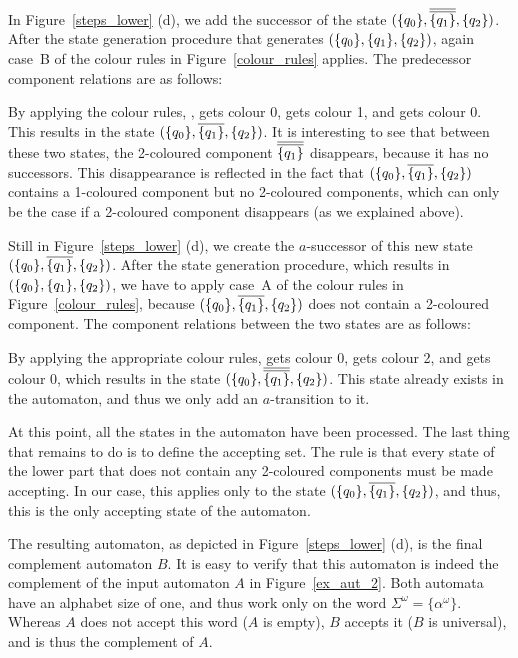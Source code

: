 In Figure~\ref{steps_lower} (d), we add the successor of the state $(\qm0, \cl2{\qm1}, \qm2)$. After the state generation procedure that generates $(\{q_{0}\}, \{q_{1}\}, \{q_{2}\})$, again case~B of the colour rules in Figure~\ref{colour_rules} applies. The predecessor component relations are as follows:

\begin{center}
\PredCompsThree
\end{center}

By applying the colour rules,  , gets colour 0,  gets colour 1, and  gets colour 0. This results in the state $(\qm0, \cl1{\qm1}, \qm2)$. It is interesting to see that between these two states, the 2-coloured component $\cl2{\qm1}$ disappears, because it has no successors. This disappearance is reflected in the fact that $(\qm0, \cl1{\qm1}, \qm2)$ contains a 1-coloured component but no 2-coloured components, which can only be the case if a 2-coloured component disappears (as we explained above).

Still in Figure~\ref{steps_lower} (d), we create the $a$-successor of this new state $(\qm0, \cl1{\qm1}, \qm2)$. After the state generation procedure, which results in $(\{q_{0}\}, \{q_{1}\}, \{q_{2}\})$, we have to apply case~A of the colour rules in Figure~\ref{colour_rules}, because $(\qm0, \cl1{\qm1}, \qm2)$ does not contain a 2-coloured component. The component relations between the two states are as follows:

\begin{center}
\PredCompsFour
\end{center}

By applying the appropriate colour rules,  gets colour 0,  gets colour 2, and  gets colour 0, which results in the state $(\qm0, \cl2{\qm1}, \qm2)$. This state already exists in the automaton, and thus we only add an $a$-transition to it.

At this point, all the states in the automaton have been processed. The last thing that remains to do is to define the accepting set. The rule is that every state of the lower part that does not contain any 2-coloured components must be made accepting. In our case, this applies only to the state $(\qm0, \cl1{\qm1}, \qm2)$, and thus, this is the only accepting state of the automaton.

The resulting automaton, as depicted in Figure~\ref{steps_lower} (d), is the final complement automaton $B$. It is easy to verify that this automaton is indeed the complement of the input automaton $A$ in Figure~\ref{ex_aut_2}. Both automata have an alphabet size of one, and thus work only on the word $\Sigma^\omega = \{\alpha^\omega\}$. Whereas $A$ does not accept this word ($A$ is empty), $B$ accepts it ($B$ is universal), and is thus the complement of $A$.

